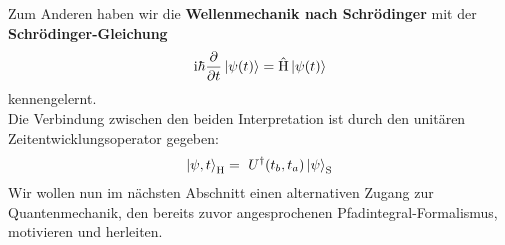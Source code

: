 Zum Anderen haben wir die \textbf{Wellenmechanik nach Schrödinger} mit der \textbf{Schrödinger-Gleichung}
\begin{align}
		\mathrm{i}\hbar \frac{\partial}{\partial t} \ket{\psi(t)} = \hat{\text{H}} \ket{\psi(t)}
	\end{align}
kennengelernt. \\
Die Verbindung zwischen den beiden Interpretation ist durch den unitären Zeitentwicklungsoperator gegeben:
\begin{align}
	\ket{\psi,t}_{\text{H}} = \ U^{\dagger}(t_b,t_a)\ket{\psi}_{\text{S}}
\end{align}
Wir wollen nun im nächsten Abschnitt einen alternativen Zugang zur Quantenmechanik, den bereits zuvor angesprochenen Pfadintegral-Formalismus, motivieren und herleiten.